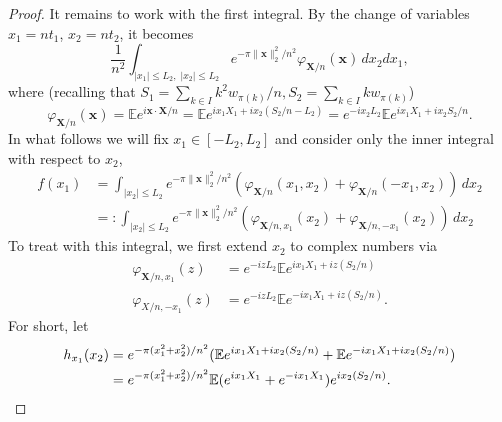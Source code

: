 \documentclass[reqno]{amsart}
\newcommand\BX{{\mathbf X}}
\newcommand\BMx{{\bm x}}
\newcommand\BMX{{\bm X}}
\theoremstyle{plain}
\theoremstyle{definition}
\begin{document}
\begin{proof}
It remains to work with the first integral. By the change of variables $x_{1} = n t_{1}$, $x_{2} = n t_{2}$, it becomes
\[
\frac{1}{n^{2}}\int_{|x_{1}| \le L_{2},\; |x_{2}| \le L_{2}} e^{-\pi  \|\BMx\|_{2}^{2}/n^{2}} \varphi_{\BX/n}(\BMx) \, dx_{2}dx_{1},
\]
where (recalling that $S_{1}= \sum_{k\in I} k^{2}w_{\pi(k)}/n, S_{2}=\sum_{k\in I} k w_{\pi(k)}$)
\[
\varphi_{\BMX/n}(\BMx) = \mathbb{E} e^{i\BMx \cdot \BMX/n}
= \mathbb{E} e^{i x_{1} X_{1} + i x_{2} (S_{2}/n -L_{2})} =  e^{-i x_{2}L_{2}}\mathbb{E} e^{i x_{1} X_{1} + i x_{2} S_{2}/n}.
\]
In what follows we will fix $x_{1} \in [-L_{2},L_{2}]$ and consider only the inner integral with respect to $x_{2}$, 
\begin{align*}
f(x_{1})&=\int_{|x_{2}| \le L_{2}} e^{-\pi  \|\BMx\|_{2}^{2}/n^{2}} (\varphi_{\BMX/n}(x_{1},x_{2})+\varphi_{\BMX/n}(-x_{1},x_{2})) \, dx_{2}\\
&=:\int_{|x_{2}| \le L_{2}} e^{-\pi  \|\BMx\|_{2}^{2}/n^{2}} (\varphi_{\BMX/n,x_{1}}(x_{2})+\varphi_{\BMX/n,-x_{1}}(x_{2})) \, dx_{2}
\end{align*}
To treat with this integral, we first extend $x_{2}$ to complex numbers via
\begin{align*}
\varphi_{\BMX/n,x_{1}}(z)& = e^{-i zL_{2}}\mathbb{E} e^{i x_{1} X_{1} + i z (S_{2}/n)}\\
\varphi_{X/n,-x_{1}}(z)& = e^{-i zL_{2}}\mathbb{E} e^{-i x_{1} X_{1} + i z (S_{2}/n)}.
\end{align*}
For short, let 
\begin{align}\label{eqn:hx_{1}}
h_{x_{1}}(x_{2}) &=  e^{-\pi  (x_{1}^{2} + x_{2}^{2})/n^{2}} (\mathbb{E} e^{i x_{1} X_{1} + i x_{2} (S_{2}/n)} +  \mathbb{E} e^{-i x_{1} X_{1} +i x_{2} (S_{2}/n)})\nonumber \\
 &=e^{-\pi  (x_{1}^{2} + x_{2}^{2})/n^{2}} \mathbb{E} (e^{i x_{1} X_{1}}+ e^{-i x_{1} X_{1}})e^{i x_{2} (S_{2}/n)}.
\end{align}


\end{proof}
\end{document}
